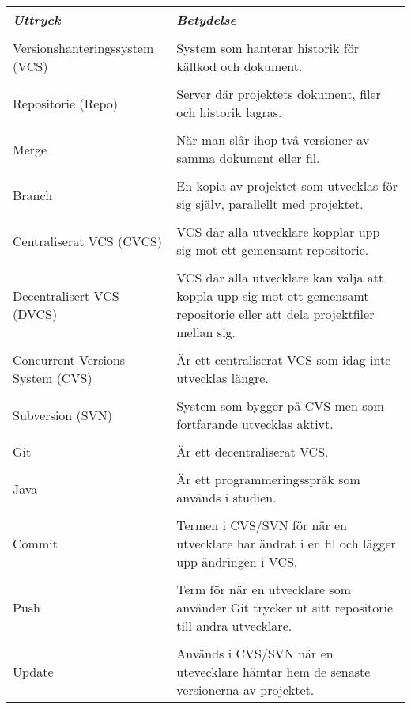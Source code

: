 \begin{table}

\begin{tabular}{ | l |  p{7cm} |}
\hline
\emph{Uttryck}	 & \emph{Betydelse} \\ \hline \hline \\
Versionshanteringssystem (VCS) &	System som hanterar historik för källkod och dokument. \\ \hline 
 \\Repositorie (Repo) &	Server där projektets dokument, filer och historik lagras. \\ \hline 
 \\ Merge	& När man slår ihop två versioner av samma dokument eller fil. \\ \hline 
\\Branch & En kopia av projektet som utvecklas för sig själv, parallellt med projektet.  \\ \hline
\\Centraliserat VCS (CVCS) &	VCS där alla utvecklare kopplar upp sig mot ett gemensamt repositorie. \\ \hline
\\Decentralisert VCS (DVCS) &	VCS där alla utvecklare kan välja att koppla upp sig mot ett gemensamt repositorie eller att dela projektfiler mellan sig. \\ \hline
\\Concurrent Versions System (CVS) &	Är ett centraliserat VCS som idag inte utvecklas längre. \\ \hline
\\Subversion (SVN) &	System som bygger på CVS men som fortfarande utvecklas aktivt. \\ \hline
\\Git &	Är ett decentraliserat VCS. \\ \hline
\\Java &	Är ett programmeringsspråk som används i studien. \\ \hline
\\Commit &	Termen i CVS/SVN för när en utvecklare har ändrat i en fil och lägger upp ändringen i VCS. \\ \hline
\\Push &	Term för när en utvecklare som använder Git trycker ut sitt repositorie till andra utvecklare. \\ \hline
\\Update &	Används i CVS/SVN när en utevecklare hämtar hem de senaste versionerna av projektet. \\ \hline

\end{tabular}
\end{table}

